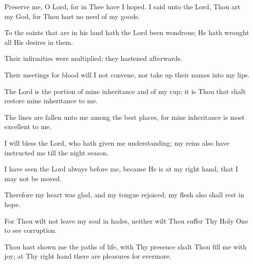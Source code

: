 Preserve me, O Lord, for in Thee have I hoped. I said unto the Lord, Thou art my God, for Thou hast no need of my goods.

To the saints that are in his land hath the Lord been wondrous; He hath wrought all His desires in them.

Their infirmities were multiplied; they hastened afterwards.

Their meetings for blood will I not convene, nor take up their names into my lips.

The Lord is the portion of mine inheritance and of my cup; it is Thou that shalt restore mine inheritance to me.

The lines are fallen unto me among the best places, for mine inheritance is most excellent to me.

I will bless the Lord, who hath given me understanding; my reins also have instructed me till the night season.

I have seen the Lord always before me, because He is at my right hand, that I may not be moved.

Therefore my heart was glad, and my tongue rejoiced; my flesh also shall rest in hope.

For Thou wilt not leave my soul in hades, neither wilt Thou suffer Thy Holy One to see corruption.

Thou hast shown me the paths of life, with Thy presence shalt Thou fill me with joy; at Thy right hand there are pleasures for evermore.
